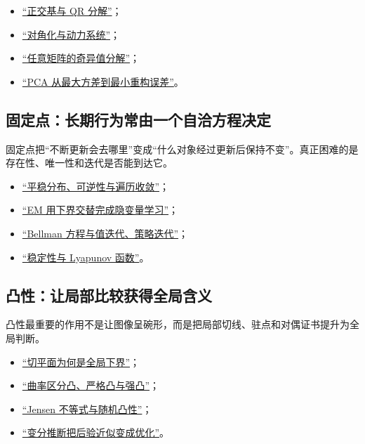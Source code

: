 \begin{itemize}
\tightlist
\item \hyperref[sec:03-Linear-Algebra/03-Orthogonality/04]{``正交基与 QR 分解''}；
\item \hyperref[sec:03-Linear-Algebra/05-Eigenvalues-and-Eigenvectors/02]{``对角化与动力系统''}；
\item \hyperref[sec:03-Linear-Algebra/07-SVD-and-Data-Applications/01]{``任意矩阵的奇异值分解''}；
\item \hyperref[sec:13-Machine-Learning/04-Dimensionality-Reduction/01]{``PCA 从最大方差到最小重构误差''}。
\end{itemize}

\subsection{固定点：长期行为常由一个自洽方程决定}

固定点把``不断更新会去哪里''变成``什么对象经过更新后保持不变''。真正困难的是存在性、唯一性和迭代是否能到达它。

\begin{itemize}
\tightlist
\item \hyperref[sec:06-Random-Processes/03-Markov-Chains/04]{``平稳分布、可逆性与遍历收敛''}；
\item \hyperref[sec:13-Machine-Learning/06-Probabilistic-Models/04]{``EM 用下界交替完成隐变量学习''}；
\item \hyperref[sec:16-Control-and-Reinforcement-Learning/02-Reinforcement-Learning/02]{``Bellman 方程与值迭代、策略迭代''}；
\item \hyperref[sec:15-Differential-Equations-and-Dynamical-Systems/02-Stability-and-Dynamical-Systems/02]{``稳定性与 Lyapunov 函数''}。
\end{itemize}

\subsection{凸性：让局部比较获得全局含义}

凸性最重要的作用不是让图像呈碗形，而是把局部切线、驻点和对偶证书提升为全局判断。

\begin{itemize}
\tightlist
\item \hyperref[sec:09-Convex-Optimization/03-Convex-Functions/02]{``切平面为何是全局下界''}；
\item \hyperref[sec:09-Convex-Optimization/03-Convex-Functions/03]{``曲率区分凸、严格凸与强凸''}；
\item \hyperref[sec:05-Probability/07-Transforms-and-Bounds/03]{``Jensen 不等式与随机凸性''}；
\item \hyperref[sec:13-Machine-Learning/08-Sampling-and-Inference/03]{``变分推断把后验近似变成优化''}。
\end{itemize}

